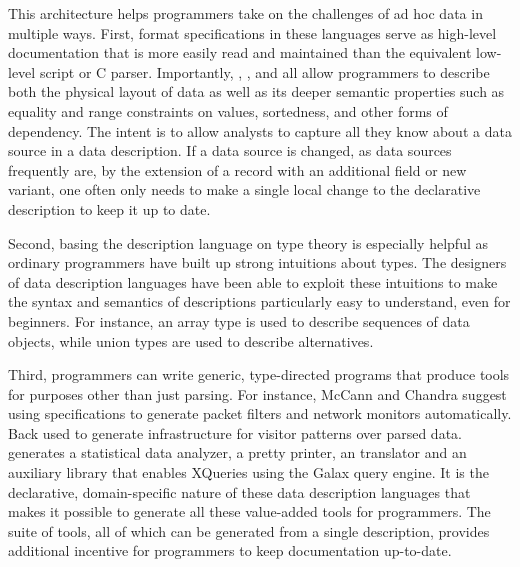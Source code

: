 This architecture helps programmers take on the challenges of ad hoc
data in multiple ways.  First, format specifications in these
languages serve as high-level documentation that is more easily read
and maintained than the equivalent low-level \perl{} script or C
parser.  Importantly, \datascript{}, \packettypes{}, and \pads{} all
allow programmers to describe both the physical layout of data as well
as its deeper semantic properties such as equality and range
constraints on values, sortedness, and other forms of dependency.  The
intent is to allow analysts to capture all they know about a data
source in a data description.  If a data source is changed, as data
sources frequently are, by the extension of a record with an
additional field or new variant, one often only needs to make a single
local change to the declarative description to keep it up to date.

Second, basing the description language on type theory is especially helpful as
ordinary programmers have built up strong intuitions about types.  
The designers of data description languages
have been able to exploit these intuitions to make the syntax and
semantics of descriptions
particularly easy to understand, even for beginners.  For instance,
an array type is used to describe sequences of data objects, while
union types are used to describe alternatives.

Third, programmers can write generic, type-directed programs that
produce tools for purposes other than just parsing.  For instance,
McCann and Chandra suggest using \packettypes{} specifications to
generate packet filters and network monitors automatically.  Back used
\datascript{} to generate infrastructure for visitor patterns over
parsed data. \pads{} generates a statistical data analyzer, a pretty
printer, an \xml{} translator and an auxiliary library that enables
XQueries using the Galax query engine\cite{galax}.  It is the
declarative, domain-specific nature of these data description
languages that makes it possible to generate all these value-added
tools for programmers.  The suite of tools, all of which can be
generated from a single description, provides additional incentive for
programmers to keep documentation up-to-date.


